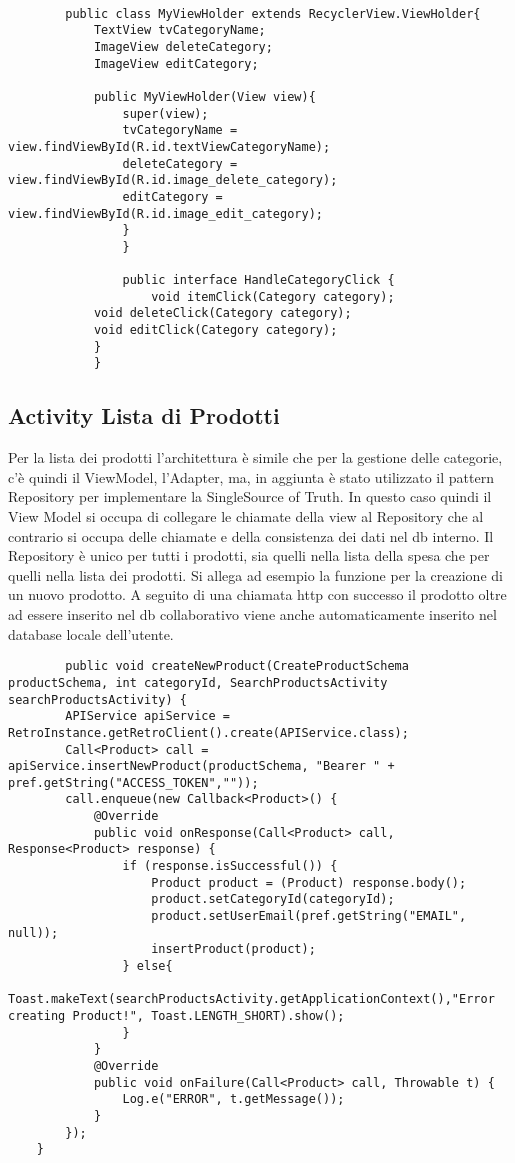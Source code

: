 \documentclass[11pt]{article}
\begin{document}
    \begin{lstlisting}
        
        public class MyViewHolder extends RecyclerView.ViewHolder{
            TextView tvCategoryName;
            ImageView deleteCategory;
            ImageView editCategory;
                            
            public MyViewHolder(View view){
                super(view);
                tvCategoryName = view.findViewById(R.id.textViewCategoryName);
                deleteCategory = view.findViewById(R.id.image_delete_category);
                editCategory = view.findViewById(R.id.image_edit_category);
                }
                }
                
                public interface HandleCategoryClick {
                    void itemClick(Category category);
            void deleteClick(Category category);
            void editClick(Category category);
            }
            }
        \end{lstlisting}
    \subsection{Activity Lista di Prodotti}
    Per la lista dei prodotti l'architettura è simile che per la gestione delle categorie, c'è quindi il ViewModel,
    l'Adapter, ma, in aggiunta è stato utilizzato il pattern Repository per implementare la SingleSource of Truth.
    In questo caso quindi il View Model si occupa di collegare le chiamate della view al Repository che al contrario    
    si occupa delle chiamate e della consistenza dei dati nel db interno. Il Repository è unico per tutti i prodotti, sia 
    quelli nella lista della spesa che per quelli nella lista dei prodotti. Si allega ad esempio la funzione per la creazione di
    un nuovo prodotto. A seguito di una chiamata http con successo il prodotto oltre ad essere inserito nel db collaborativo
    viene anche automaticamente inserito nel database locale dell'utente.
    \begin{lstlisting}
        public void createNewProduct(CreateProductSchema productSchema, int categoryId, SearchProductsActivity searchProductsActivity) {
        APIService apiService = RetroInstance.getRetroClient().create(APIService.class);
        Call<Product> call = apiService.insertNewProduct(productSchema, "Bearer " + pref.getString("ACCESS_TOKEN",""));
        call.enqueue(new Callback<Product>() {
            @Override
            public void onResponse(Call<Product> call, Response<Product> response) {
                if (response.isSuccessful()) {
                    Product product = (Product) response.body();
                    product.setCategoryId(categoryId);
                    product.setUserEmail(pref.getString("EMAIL", null));
                    insertProduct(product);
                } else{
                    Toast.makeText(searchProductsActivity.getApplicationContext(),"Error creating Product!", Toast.LENGTH_SHORT).show();
                }
            }
            @Override
            public void onFailure(Call<Product> call, Throwable t) {
                Log.e("ERROR", t.getMessage());
            }
        });
    }
    \end{lstlisting}
\end{document}
